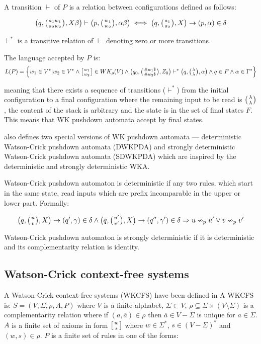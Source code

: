 A transition $\vdash$ of $P$ is a relation between configurations defined as follows:

$$\big(q, \wkpair{a_1w_1}{a_2w_2}, X\beta\big) \vdash \big(p, \wkpair{w_1}{w_2}, \alpha\beta\big) \iff \big(q, \wkpair{a_1}{a_2}, X\big) \rightarrow (p, \alpha) \in \delta$$

$\vdash^*$ is a transitive relation of $\vdash$ denoting zero or more transitions.

The language accepted by $P$ is:
$$L(P) = \Big\{w_1 \in V^*| w_2 \in V^* \wedge \wkdomain{w_1}{w_2} \in WK_{\rho}(V)  \wedge \big(q_0, \wkpair{\#w_1\$}{\#w_2\$}, Z_0\big) \vdash^* \big(q, \wkpair{\lambda}{\lambda}, \alpha \big) \wedge q \in F \wedge \alpha \in \Gamma^* \Big\}$$

meaning that there exists a sequence of transitions ($\vdash^*$) from the initial configuration to a final configuration where the remaining input to be read is $\wkpair{\lambda}{\lambda}$, the content of the stack is arbitrary and the state is in the set of final states $F$. This means that WK pushdown automata accept by final states.

\cite {WK_PUSHDOWN_AUT} also defines two special versions of WK pushdown automata --- deterministic Watson-Crick pushdown automata (DWKPDA) and strongly deterministic Watson-Crick pushdown automata (SDWKPDA) which are inspired by the deterministic and strongly deterministic WKA.

Watson-Crick pushdown automaton is deterministic if any two rules, which start in the same state, read inputs which are prefix incomparable in the upper or lower part. Formally:

$$\big(q, \wkpair{u}{v}, X\big) \rightarrow (q', \gamma) \in \delta \wedge \big(q, \wkpair{u'}{v'}, X\big) \rightarrow (q'', \gamma') \in \delta \Rightarrow u \nsim_p u' \vee v \nsim_p v'$$

Watson-Crick pushdown automaton is strongly deterministic if it is deterministic and its complementarity relation is identity.


\subsection{Watson-Crick context-free systems}
A Watson-Crick context-free systems (WKCFS) have been defined in \cite{WKCF_SYSTEMS} A WKCFS is: $S = (V, \Sigma, \rho, A, P)$ where $V$ is a finite alphabet, $\Sigma \subset V$, $\rho \subseteq \Sigma \times (V \setminus \Sigma)$ is a complementarity relation where if $(a, \overline{a}) \in \rho$ then $\overline{a} \in V - \Sigma$ is unique for $a \in \Sigma$. $A$ is a finite set of axioms in form $\wkdomain{w}{s}$ where $w \in \Sigma^*$, $s \in (V - \Sigma)^*$ and $(w, s) \in \rho$. $P$ is a finite set of rules in one of the forms:

